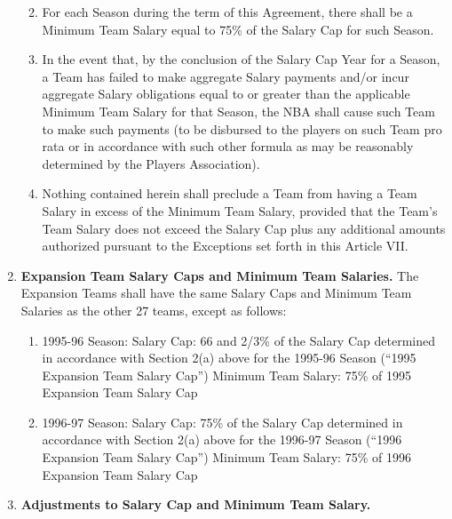 \documentclass[
]{book}
\providecommand{\tightlist}{%
  \setlength{\itemsep}{0pt}\setlength{\parskip}{0pt}}
\begin{document}
\begin{enumerate}
  \begin{enumerate}
  \def\labelenumii{(\arabic{enumii})}
  \tightlist
  \item
    For each Season during the term of this Agreement, there shall be a Minimum Team Salary equal to 75\% of the Salary Cap for such Season.
  \item
    In the event that, by the conclusion of the Salary Cap Year for a Season, a Team has failed to make aggregate Salary payments and/or incur aggregate Salary obligations equal to or greater than the applicable Minimum Team Salary for that Season, the NBA shall cause such Team to make such payments (to be disbursed to the players on such Team pro rata or in accordance with such other formula as may be reasonably determined by the Players Association).
  \item
    Nothing contained herein shall preclude a Team from having a Team Salary in excess of the Minimum Team Salary, provided that the Team's Team Salary does not exceed the Salary Cap plus any additional amounts authorized pursuant to the Exceptions set forth in this Article VII.
  \end{enumerate}
\item
  \textbf{Expansion Team Salary Caps and Minimum Team Salaries.} The Expansion Teams shall have the same Salary Caps and Minimum Team Salaries as the other 27 teams, except as follows:

  \begin{enumerate}
  \def\labelenumii{(\arabic{enumii})}
  \tightlist
  \item
    1995-96 Season:
    Salary Cap: 66 and 2/3\% of the Salary Cap determined in accordance with Section 2(a) above for the 1995-96 Season (``1995 Expansion Team Salary Cap'')
    Minimum Team Salary: 75\% of 1995 Expansion Team Salary Cap
  \item
    1996-97 Season:
    Salary Cap: 75\% of the Salary Cap determined in accordance with Section 2(a) above for the 1996-97 Season (``1996 Expansion Team Salary Cap'')
    Minimum Team Salary: 75\% of 1996 Expansion Team Salary Cap
  \end{enumerate}
\item
  \textbf{Adjustments to Salary Cap and Minimum Team Salary.}


\end{enumerate}
\end{document}
